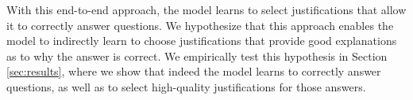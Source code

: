 
With this end-to-end approach, the model learns to select justifications that allow it to correctly answer questions.  We hypothesize that this approach enables the model to indirectly learn to choose justifications that provide good explanations as to why the answer is correct. We empirically test this hypothesis in Section \ref{sec:results}, where we show that indeed the model learns to correctly answer questions, as well as to select high-quality justifications for those answers. 
